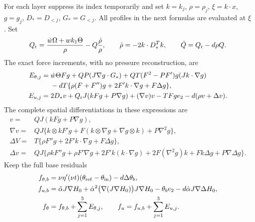 For each layer suppress its index temporarily and set
$k=k_j$, $\rho=\rho_j$, $\xi=k\cdot x$, $g=g_j$,
$D_*=D_{<j}$, $G_*=G_{<j}$. All profiles in the next formulas
are evaluated at $\xi$. Set
\begin{equation}\label{tts:Qrest}
 Q_{\rm r}=\frac{\dot w\Omega+w k_1\Theta}{\rho}
                    -Q\frac{\dot\rho}{\rho},\qquad
 \dot\rho=-2k\cdot D_*^Tk,
 \qquad\dot Q=Q_{\rm r}-d\rho Q.
\end{equation}
The exact force increments, with no pressure reconstruction, are
\begin{align}\label{tts:scalarforce}
 E_{\theta,j}={}&\dot w\Theta Fg+QP(J\nabla g\cdot G_*)
           +QT(F^2-PF')g(Jk\cdot\nabla g)\nonumber\\
 &-dT\{\rho(F+F'')g+2F'k\cdot\nabla g+F\Delta g\},\\
 E_{u,j}={}&2D_*v+Q_{\rm r}J(kFg+P\nabla g)
          +(\nabla v)v-TFg e_2-d(\rho v+\Delta v).
 \label{tts:vectorforce}
\end{align}
The complete spatial differentiations in these expressions are
\begin{align}\label{tts:spatialjets}
 v={}&QJ(kFg+P\nabla g),\nonumber\\
 \nabla v={}&QJ\{k\otimes k F'g+
 F(k\otimes\nabla g+\nabla g\otimes k)+P\nabla^2g\},\\
 \Delta V={}&T\{\rho F''g+2F'k\cdot\nabla g+F\Delta g\},
 \nonumber\\
 \Delta v={}&QJ\{\rho kF''g+\rho F'\nabla g
       +2F'k(k\cdot\nabla g)+2F(\nabla^2g)k
       +Fk\Delta g+P\nabla\Delta g\}.
 \nonumber
\end{align}
Keep the full base residuals
\begin{align}\label{tts:baseforce}
 f_{\theta,b}&=\nu\eta'(\nu t)(\theta_{\rm ref}-\theta_{\rm in})
                                      -d\Delta\theta_b,\nonumber\\
 f_{u,b}&=\ddot\alpha J\nabla H_0
    +\dot\alpha^2\bigl(\nabla(J\nabla H_0)\bigr)J\nabla H_0
    -\theta_b e_2-d\dot\alpha J\nabla\Delta H_0,\\
 f_\theta&=f_{\theta,b}+\sum_{j=1}^3E_{\theta,j},\qquad
 f_u=f_{u,b}+\sum_{j=1}^3E_{u,j}.\nonumber
\end{align}

